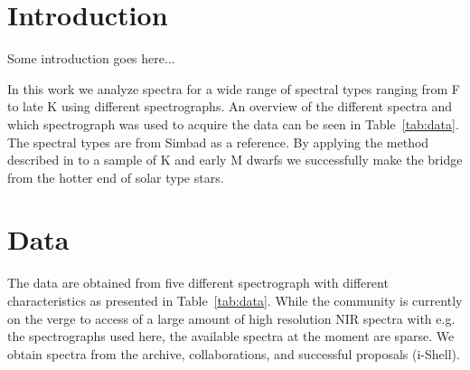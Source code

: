 \documentclass{aa}
\begin{document}
\maketitle



\section{Introduction}
\label{sec:introduction}

Some introduction goes here...

In this work we analyze spectra for a wide range of spectral types ranging from
F to late K using different spectrographs. An overview of the different spectra
and which spectrograph was used to acquire the data can be seen in
Table~\ref{tab:data}. The spectral types are from Simbad as a reference. By
applying the method described in \citet{Andreasen2016} to a sample of K and
early M dwarfs we successfully make the bridge from the hotter end of solar type
stars.





\section{Data}
\label{sec:data}

The data are obtained from five different spectrograph with different
characteristics as presented in Table~\ref{tab:data}. While the community is
currently on the verge to access of a large amount of high resolution NIR
spectra with e.g. the spectrographs used here, the available spectra at the
moment are sparse. We obtain spectra from the archive, collaborations, and
successful proposals (i-Shell).
\end{document}
